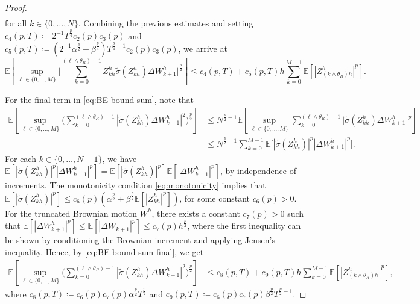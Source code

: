 \documentclass[onseside, final]{amsart}
\theoremstyle{definition}
\newcommand{\E}{\mathbb E}
\numberwithin{equation}{section}
\begin{document}
\begin{proof}
\begin{equation}
\begin{split}
				\end{split}
			\end{equation}
			for all $k \in \{0, \dotsc, N\}$.
			Combining the previous estimates and setting $c_4(p, T) \coloneqq 2^{-1} T^{\frac p4} c_2(p)c_3(p)$ and $c_5(p, T) \coloneqq (2^{-1}\alpha^{\frac p2} + \beta^{\frac p4})T^{\frac p4 - 1}c_2(p)c_3(p)$, we arrive at
			\begin{equation}\label{eq:BE-bound-2}
				\E \!\left[\sup_{\ell \in \{0, \dotsc, M\}}\bigg | \sum_{k = 0}^{(\ell \wedge \theta_R) - 1} Z^h_{kh} \tilde \sigma(Z^h_{kh}) \Delta W^h_{k + 1}\bigg |^{\frac p2}\right]\! \leq c_4(p, T) + c_5(p, T) h \sum_{k = 0}^{M - 1}\E[|Z^h_{(k \wedge \theta_R)h}|^p].
			\end{equation}
			
			For the final term in \eqref{eq:BE-bound-sum}, note that
			 \begin{equation}\label{eq:BE-bound-sum-final}
			 	\begin{split}
			 		\E\!\left[\sup_{\ell \in \{0, \dotsc, M\}}\bigg(\sum_{k = 0}^{(\ell \wedge \theta_R) - 1}|\tilde \sigma(Z^h_{kh}) \Delta W^h_{k + 1}|^2\bigg)^{\frac p2}\right]\! & \leq N^{\frac p2 - 1}\E\!\left[\sup_{\ell \in \{0, \dotsc, M\}}\sum_{k = 0}^{(\ell \wedge \theta_R) - 1}\bigl|\tilde \sigma(Z^h_{kh}) \Delta W^h_{k + 1}\bigr|^p\right]\!\\
			 		& \leq N^{\frac p2 - 1}\sum_{k = 0}^{M - 1}\E\bigl[|\tilde \sigma(Z^h_{kh})|^p|\Delta W^h_{k + 1}|^p\bigr].
			 	\end{split}
			 \end{equation}
			 For each $k \in \{0, \dotsc, N - 1\}$, we have $\E[|\tilde \sigma(Z^h_{kh})|^p|\Delta W^h_{k + 1}|^p] = \E[|\tilde \sigma(Z^h_{kh})|^p]\E[|\Delta W^h_{k + 1}|^p]$, by independence of increments. The monotonicity condition \eqref{eq:monotonicity} implies that $\E[|\tilde \sigma(Z^h_{kh})|^p] \leq c_6(p)(\alpha^{\frac p2} + \beta^{\frac p2}\E[|Z^h_{kh}|^p])$, for some constant $c_6(p) > 0$. For the truncated Brownian motion $W^h$, there exists a constant $c_7(p) > 0$ such that $\E[|\Delta W^h_{k + 1}|^p] \leq \E[|\Delta W_{k + 1}|^p] \leq c_7(p) h^{\frac p2}$, where the first inequality can be shown by conditioning the Brownian increment and applying Jensen's inequality. Hence, by \eqref{eq:BE-bound-sum-final}, we get
			 \begin{equation}\label{eq:BE-bound-3}
			 	\begin{split}
			 		\E\!\left[\sup_{\ell \in \{0, \dotsc, M\}}\bigg(\sum_{k = 0}^{(\ell \wedge \theta_R) - 1}|\tilde \sigma(Z^h_{kh}) \Delta W^h_{k + 1}|^2\bigg)^{\frac p2}\right]\! & \leq c_8(p, T) + c_9(p, T)h\sum_{k = 0}^{M - 1}\E[|Z^h_{(k \wedge \theta_R)h}|^p],
			 	\end{split}
			 \end{equation}
			 where $c_8(p, T) \coloneqq c_6(p) c_7(p) \alpha^{\frac p2} T^{\frac p2}$ and $c_9(p, T) \coloneqq c_6(p) c_7(p) \beta^{\frac p2}T^{\frac p2 - 1}$.
			 		 

\end{proof}
\end{document}
